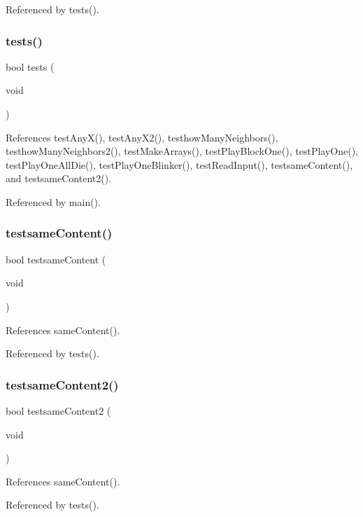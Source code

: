 Referenced by tests().

\mbox{\label{tests_8c_a5e6e6e78df62797046c9ea173550a68a}} 
\subsubsection{tests()}
{\footnotesize\ttfamily bool tests (\begin{DoxyParamCaption}\item[{void}]{ }\end{DoxyParamCaption})}



References test\+Any\+X(), test\+Any\+X2(), testhow\+Many\+Neighbors(), testhow\+Many\+Neighbors2(), test\+Make\+Arrays(), test\+Play\+Block\+One(), test\+Play\+One(), test\+Play\+One\+All\+Die(), test\+Play\+One\+Blinker(), test\+Read\+Input(), testsame\+Content(), and testsame\+Content2().



Referenced by main().

\mbox{\label{tests_8c_ad1ec7d5978be1205c30b9afae56da573}} 
\subsubsection{testsame\+Content()}
{\footnotesize\ttfamily bool testsame\+Content (\begin{DoxyParamCaption}\item[{void}]{ }\end{DoxyParamCaption})}



References same\+Content().



Referenced by tests().

\mbox{\label{tests_8c_a8dc3ac14f36a875ee33318083f36a4f3}} 
\subsubsection{testsame\+Content2()}
{\footnotesize\ttfamily bool testsame\+Content2 (\begin{DoxyParamCaption}\item[{void}]{ }\end{DoxyParamCaption})}



References same\+Content().



Referenced by tests().

